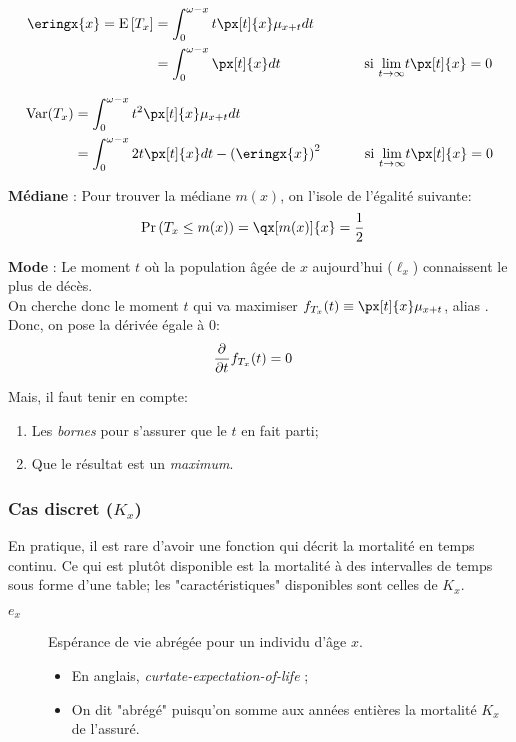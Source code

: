 \documentclass[10pt, french]{article}
\begin{document}
\begin{multicols*}{3}
\begin{align*}
	\eringx{x}
	=	\esp{T_{x}}
	&=	\int_{0}^{\omega - x} t \px[t]{x} \mu_{x + t} dt	\\
	&=	\int_{0}^{\omega - x} \px[t]{x} dt	\qquad\qquad\quad\quad	\text{si } \limz{t}{\infty} t \px[t]{x} = 0
\end{align*}
		
\begin{align*}
	\text{Var}(T_{x})
	&=	\int_{0}^{\omega - x} t^{2} \px[t]{x} \mu_{x + t} dt	\\
	&=	\int_{0}^{\omega - x} 2t  \px[t]{x} dt - \left(\eringx{x}\right)^{2}	\qquad\quad	\text{si } \limz{t}{\infty} t \px[t]{x} = 0
\end{align*}

\textbf{Médiane} : 
Pour trouver la médiane $m(x)$, on l'isole de l'égalité suivante:
\begin{align*}
	\Pr\left(T_{x} \leq m(x)\right)
	&=	\qx[m(x)]{x} 
	=	\frac{1}{2}
\end{align*}

\textbf{Mode} : Le moment $t$ où la population âgée de $x$ aujourd'hui ($\ell_{x}$) connaissent le plus de décès.\\
On cherche donc le moment $t$ qui va maximiser $f_{T_{x}}(t) \equiv \px[t]{x} \mu_{x + t}$, alias .\\

Donc, on pose la dérivée égale à 0:
\begin{align*}
	\frac{\partial^{}}{\partial t^{}} f_{T_{x}}(t) 
	&=	0
\end{align*}

Mais, il faut tenir en compte: 
\begin{enumerate}
	\item	Les \textit{bornes} pour s'assurer que le $t$ en fait parti;
	\item	Que le résultat est un \textit{maximum}.
\end{enumerate}

\subsubsection{Cas discret ($K_{x}$)}
En pratique, il est rare d'avoir une fonction qui décrit la mortalité en temps continu. Ce qui est plutôt disponible est la mortalité à des intervalles de temps sous forme d'une table; les "caractéristiques" disponibles sont celles de $K_{x}$. 

\begin{distributions}[Notation]
\begin{description}
	\item[$e_{x}$]	Espérance de vie abrégée pour un individu d'âge $x$.
		\begin{itemize}[leftmargin = *]
		\item	En anglais, \og \textit{curtate-expectation-of-life} \fg{};
		\item	On dit "abrégé" puisqu'on somme aux années entières la mortalité $K_{x}$ de l'assuré.
		\end{itemize}
\end{description}
\end{distributions}


\end{multicols*}
\end{document}
